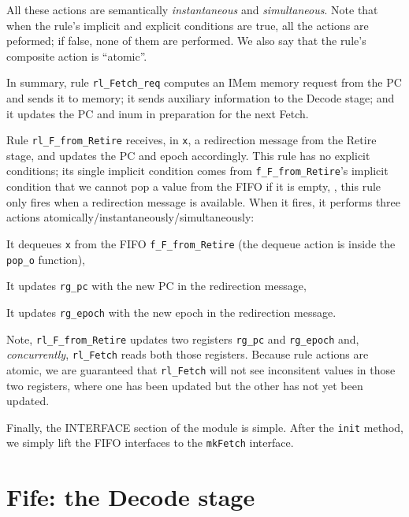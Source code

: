 All these actions are semantically \emph{instantaneous} and
\emph{simultaneous}.  Note that when the rule's implicit and explicit
conditions are true, all the actions are peformed; if false, none of
them are performed.  We also say that the rule's composite action is
``atomic''.

In summary, rule \verb|rl_Fetch_req| computes an IMem memory request
from the PC and sends it to memory; it sends auxiliary information to
the Decode stage; and it updates the PC and inum in preparation for
the next Fetch.

Rule \verb|rl_F_from_Retire| receives, in \verb|x|, a redirection
message from the Retire stage, and updates the PC and epoch
accordingly.  This rule has no explicit conditions; its single
implicit condition comes from \verb|f_F_from_Retire|'s implicit
condition that we cannot pop a value from the FIFO if it is empty,
{\ie}, this rule only fires when a redirection message is available.
When it fires, it performs three actions
atomically/instantaneously/simultaneously:
 
\begin{tightlist}

 \item It dequeues \verb|x| from the FIFO \verb|f_F_from_Retire| (the
       dequeue action is inside the \verb|pop_o| function),
 \item It updates \verb|rg_pc| with the new PC in the redirection message,
 \item It updates \verb|rg_epoch| with the new epoch in the redirection message.

\end{tightlist}

Note, \verb|rl_F_from_Retire| updates two registers \verb|rg_pc| and
\verb|rg_epoch| and, \emph{concurrently}, \verb|rl_Fetch| reads both
those registers.  Because rule actions are atomic, we are guaranteed
that \verb|rl_Fetch| will not see inconsitent values in those two
registers, where one has been updated but the other has not yet been
updated.

Finally, the INTERFACE section of the module is simple.  After the
\verb|init| method, we simply lift the FIFO interfaces to the
\verb|mkFetch| interface.


\section{Fife: the Decode stage}

